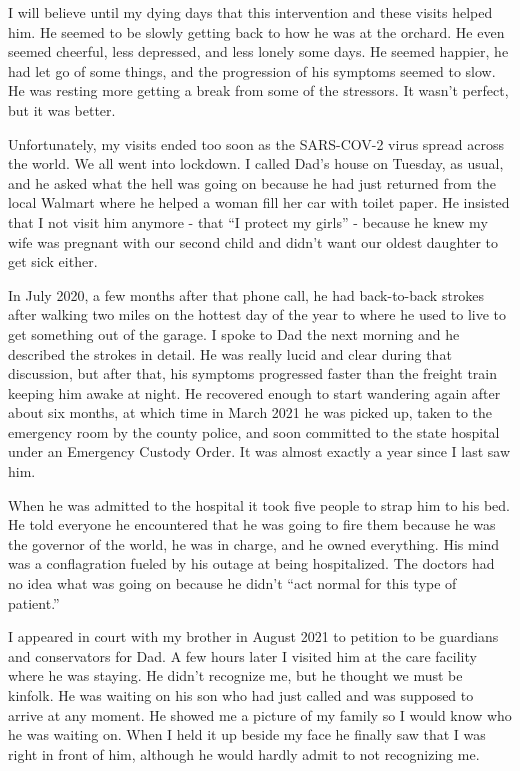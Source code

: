 \documentclass{article}
\begin{document}
I will believe until my dying days that this intervention and these visits helped him. He seemed to be  slowly getting back to how he was at the orchard. He even seemed cheerful, less depressed, and less lonely some days. He seemed happier, he had let go of some things, and the progression of his symptoms seemed to slow. He was resting more getting a break from some of the stressors. It wasn't perfect, but it was better.

Unfortunately, my visits ended too soon as the SARS-COV-2 virus spread across the world. We all went into lockdown. I called Dad's house on Tuesday, as usual, and he asked what the hell was going on because he had just returned from the local Walmart where he helped a woman fill her car with toilet paper. He insisted that I not visit him anymore - that ``I protect my girls'' - because he knew my wife was pregnant with our second child and didn't want our oldest daughter to get sick either.

In July 2020, a few months after that phone call, he had back-to-back strokes after walking two miles on the hottest day of the year to where he used to live to get something out of the garage. I spoke to Dad the next morning and he described the strokes in detail. He was really lucid and clear during that discussion, but after that, his symptoms progressed faster than the freight train keeping him awake at night. He recovered enough to start wandering again after about six months, at which time in March 2021 he was picked up, taken to the emergency room by the county police, and soon committed to the state hospital under an Emergency Custody Order. It was almost exactly a year since I last saw him. 

When he was admitted to the hospital it took five people to strap him to his bed. He told everyone he encountered that he was going to fire them because he was the governor of the world, he was in charge, and he owned everything. His mind was a conflagration fueled by his outage at being hospitalized. The doctors had no idea what was going on because he didn't ``act normal for this type of patient.''

I appeared in court with my brother in August 2021 to petition to be guardians and conservators for Dad. A few hours later I visited him at the care facility where he was staying. He didn't recognize me, but he thought we must be kinfolk. He was waiting on his son who had just called and was supposed to arrive at any moment. He showed me a picture of my family so I would know who he was waiting on. When I held it up beside my face he finally saw that I was right in front of him, although he would hardly admit to not recognizing me. 
\end{document}
